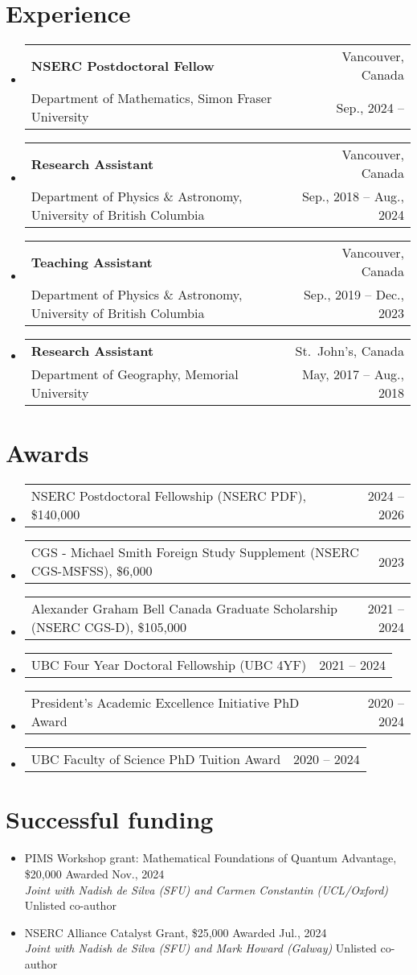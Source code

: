 \documentclass[letterpaper,11pt]{article}
\makeatletter
\newcommand{\ExperienceItem}[4]{
	\item{\vspace{-1pt}
		\begin{tabular*}{0.97\textwidth}{l@{\extracolsep{\fill}}r}
			\textbf{#1} & {#2}\\
			{#3} & {#4}
		\end{tabular*}
		\vspace{-5pt}
	}
}
\newcommand{\ExperienceSubItem}[2]{
	\item{\vspace{-3pt}
		\begin{tabular*}{0.92\textwidth}{l@{\extracolsep{\fill}}r}
			{\footnotesize #1} & {\footnotesize #2}
		\end{tabular*}
		\vspace{-5pt}
	}
}
\newcommand{\OrganizerItem}[4]{
	\item{\parbox{0.97\textwidth}{
			{#1} \hfill {#2}\\
			\emph{#3} \hfill {#4}
		}}
}
\newcommand{\AwardsItem}[2]{
	\item{\vspace{-1pt}
		\begin{tabular*}{0.97\textwidth}{l@{\extracolsep{\fill}}r}
			{#1} & {#2}
		\end{tabular*}
		\vspace{-5pt}
	}
}
\makeatother
\begin{document}
\section*{Experience}
\begin{itemize}[leftmargin=*]
	\ExperienceItem{NSERC Postdoctoral Fellow}{Vancouver, Canada}{Department of Mathematics, Simon Fraser University}{Sep., 2024 --}
	
	\ExperienceItem{Research Assistant}{Vancouver, Canada}{Department of Physics \& Astronomy, University of British Columbia}{Sep., 2018 -- Aug., 2024}
	
	\ExperienceItem{Teaching Assistant}{Vancouver, Canada}{Department of Physics \& Astronomy, University of British Columbia}{Sep., 2019 -- Dec., 2023}
	
	\ExperienceItem{Research Assistant}{St.~John's, Canada}{Department of Geography, Memorial University}{May, 2017 -- Aug., 2018}
\end{itemize}

\section*{Awards}
\begin{itemize}[leftmargin=*]
	\AwardsItem{NSERC Postdoctoral Fellowship (NSERC PDF), \$140,000}{2024 -- 2026}
	\AwardsItem{CGS - Michael Smith Foreign Study Supplement (NSERC CGS-MSFSS), \$6,000}{2023}
	\AwardsItem{Alexander Graham Bell Canada Graduate Scholarship (NSERC CGS-D), \$105,000}{2021 -- 2024}
	\AwardsItem{UBC Four Year Doctoral Fellowship (UBC 4YF)}{2021 -- 2024}
	\AwardsItem{President's Academic Excellence Initiative PhD Award}{2020 -- 2024}
	\AwardsItem{UBC Faculty of Science PhD Tuition Award }{2020 -- 2024}
\end{itemize}

\section*{Successful funding}
\begin{itemize}[leftmargin=*]
	\OrganizerItem{PIMS Workshop grant: Mathematical Foundations of Quantum Advantage, \$20,000}{Awarded Nov., 2024}{Joint with Nadish de Silva (SFU) and Carmen Constantin (UCL/Oxford)}{Unlisted co-author}
	\OrganizerItem{NSERC Alliance Catalyst Grant, \$25,000}{Awarded Jul., 2024}{Joint with Nadish de Silva (SFU) and Mark Howard (Galway)}{Unlisted co-author}
\end{itemize}
\end{document}
